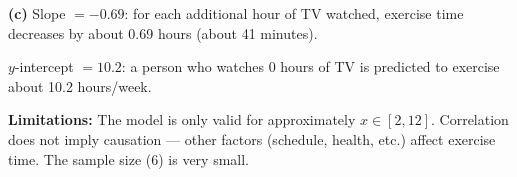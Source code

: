 \documentclass[addpoints]{exam}
\begin{document}
\begin{questions}
\begin{solution}[9cm]
\textbf{(c)} Slope $= -0.69$: for each additional hour of TV watched, exercise time decreases by about 0.69 hours (about 41 minutes).

$y$-intercept $= 10.2$: a person who watches 0 hours of TV is predicted to exercise about 10.2 hours/week.

\textbf{Limitations:} The model is only valid for approximately $x \in [2, 12]$. Correlation does not imply causation — other factors (schedule, health, etc.) affect exercise time. The sample size (6) is very small.
\end{solution}

\end{questions}
\end{document}
